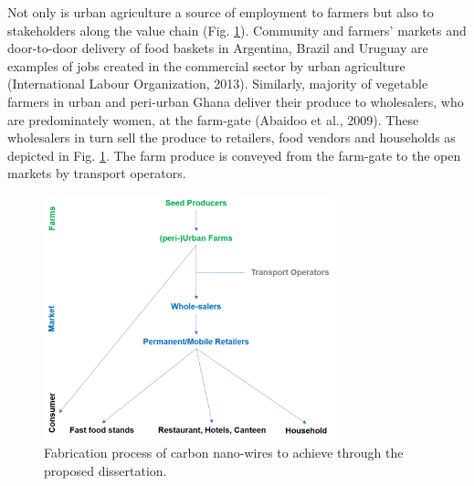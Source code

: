 Not only is urban agriculture a source of employment to farmers but also to stakeholders along the value chain (Fig. \ref{fig:vegySupplyChain}). Community and farmers' markets and door-to-door delivery of food baskets in Argentina, Brazil and Uruguay are examples of jobs created in the commercial sector by urban agriculture (International Labour Organization, 2013). Similarly, majority of vegetable farmers in urban and peri-urban Ghana deliver their produce to wholesalers, who are predominately women, at the farm-gate \cite{Amponsah2016a, Amoah2007} (Abaidoo et al., 2009). These wholesalers in turn sell the produce to retailers, food vendors and households as depicted in Fig. \ref{fig:vegySupplyChain}. The farm produce is conveyed from the farm-gate to the open markets by transport operators.

\begin{figure}[th]
\centering
\includegraphics[width=0.75\textwidth]{./Figures/vegySupplyChain.png}
\decoRule
\caption[Carbon Nano-wires Fabrication Process]{Fabrication process of carbon nano-wires to achieve through the proposed dissertation.}
\label{fig:vegySupplyChain}
\end{figure}

